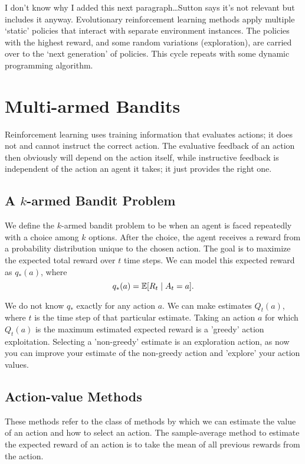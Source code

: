 \documentclass[a4paper]{report}
\begin{document}
I don’t know why I added this next paragraph…Sutton says it’s not relevant but includes it anyway. Evolutionary reinforcement learning methods apply multiple ‘static’ policies that interact with separate environment instances. The policies with the highest reward, and some random variations (exploration), are carried over to the ‘next generation’ of policies. This cycle repeats with some dynamic programming algorithm.

\newpage

\chapter{Multi-armed Bandits}
Reinforcement learning uses training information that evaluates actions; it does not and cannot instruct the correct action. The evaluative feedback of an action then obviously will depend on the action itself, while instructive feedback is independent of the action an agent it takes; it just provides the right one.

\section{A $k$-armed Bandit Problem}
We define the  $k$-armed bandit problem to be when an agent is faced repeatedly with a choice among $k$ options. After the choice, the agent receives a reward from a probability distribution unique to the chosen action. The goal is to maximize the expected total reward over $t$ time steps. We can model this expected reward as  $q_{\ast}(a)$, where
 \[
   q_{\ast}(a) = \mathbb{E}[R_t \mid A_t = a]
.\] 

We do not know $q_{\ast}$ exactly for any action $a$. We can make estimates $Q_t(a)$, where $t$ is the time step of that particular estimate. Taking an action $a$ for which $Q_t(a)$ is the maximum estimated expected reward is a 'greedy' action exploitation. Selecting a 'non-greedy' estimate is an exploration action, as now you can improve your estimate of the non-greedy action and 'explore' your action values.

\section{Action-value Methods}
These methods refer to the class of methods by which we can estimate the value of an action and how to select an action. The sample-average method to estimate the expected reward of an action is to take the mean of all previous rewards from the action.
\end{document}
